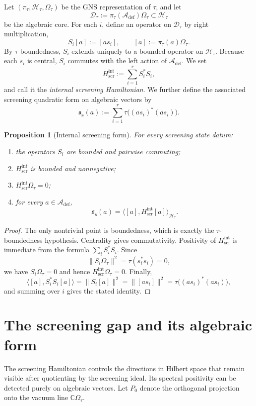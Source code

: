 \documentclass[11pt]{article}
\theoremstyle{plainstyle}
\newtheorem{proposition}[theorem]{Proposition}
\theoremstyle{defstyle}
\newcommand{\A}{\mathcal{A}}
\newcommand{\C}{\mathbb{C}}
\newcommand{\Htau}{\mathcal{H}_{\tau}}
\newcommand{\Dtau}{\mathcal{D}_{\tau}}
\newcommand{\Omegatau}{\Omega_{\tau}}
\begin{document}
Let $(\pi_\tau,\Htau,\Omegatau)$ be the GNS representation of $\tau$, and let
\[
\Dtau:=\pi_\tau(\A_{\mathrm{def}})\Omegatau
\subset \Htau
\]
be the algebraic core.
For each $i$, define an operator on $\Dtau$ by right multiplication,
\[
S_i[a]:=[a s_i],
\qquad [a]:=\pi_\tau(a)\Omegatau.
\]
By $\tau$-boundedness, $S_i$ extends uniquely to a bounded operator on $\Htau$.
Because each $s_i$ is central, $S_i$ commutes with the left action of $\A_{\mathrm{def}}$.
We set
\[
H_{\mathrm{scr}}^{\mathrm{int}}:=\sum_{i=1}^r S_i^*S_i,
\]
and call it the \emph{internal screening Hamiltonian}.
We further define the associated screening quadratic form on algebraic vectors by
\[
\mathfrak s_{\mathbf s}(a):=\sum_{i=1}^r \tau\bigl((a s_i)^*(a s_i)\bigr).
\]

\begin{proposition}[Internal screening form]
For every screening state datum:
\begin{enumerate}[label=(\alph*)]
\item the operators $S_i$ are bounded and pairwise commuting;
\item $H_{\mathrm{scr}}^{\mathrm{int}}$ is bounded and nonnegative;
\item $H_{\mathrm{scr}}^{\mathrm{int}}\Omegatau=0$;
\item for every $a\in \A_{\mathrm{def}}$,
\[
\mathfrak s_{\mathbf s}(a)=\bigl\langle [a],H_{\mathrm{scr}}^{\mathrm{int}}[a]\bigr\rangle_{\Htau}.
\]
\end{enumerate}
\end{proposition}

\begin{proof}
The only nontrivial point is boundedness, which is exactly the $\tau$-boundedness hypothesis.
Centrality gives commutativity.  Positivity of $H_{\mathrm{scr}}^{\mathrm{int}}$ is immediate from the formula
$\sum_i S_i^*S_i$.  Since
\[
\|S_i\Omegatau\|^2=\tau(s_i^*s_i)=0,
\]
we have $S_i\Omegatau=0$ and hence $H_{\mathrm{scr}}^{\mathrm{int}}\Omegatau=0$.
Finally,
\[
\bigl\langle [a],S_i^*S_i[a]\bigr\rangle=\|S_i[a]\|^2
=\|[a s_i]\|^2=\tau\bigl((a s_i)^*(a s_i)\bigr),
\]
and summing over $i$ gives the stated identity.
\end{proof}

\section{The screening gap and its algebraic form}

The screening Hamiltonian controls the directions in Hilbert space that remain visible after quotienting by the screening ideal.
Its spectral positivity can be detected purely on algebraic vectors.
Let $P_0$ denote the orthogonal projection onto the vacuum line $\C\Omegatau$.
\end{document}
